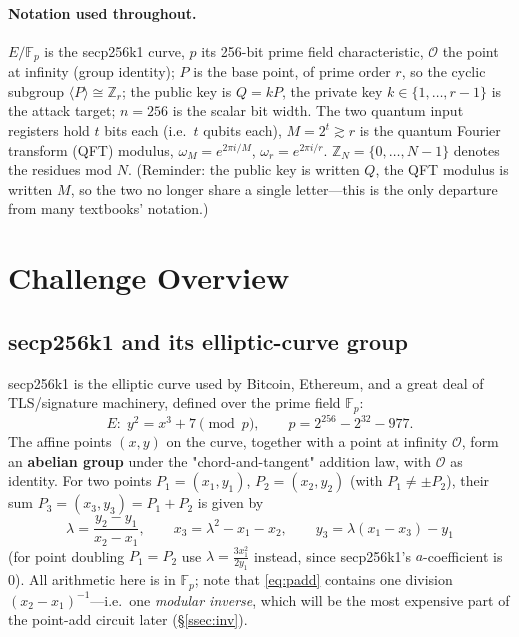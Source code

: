 \documentclass[11pt]{article}
\newcommand{\secref}[1]{\hyperref[#1]{\S\ref*{#1}}}
\begin{document}
\paragraph{Notation used throughout.}
$E/\mathbb{F}_p$ is the secp256k1 curve, $p$ its 256-bit prime field characteristic, $\mathcal{O}$ the point at infinity (group identity);
$P$ is the base point, of prime order $r$, so the cyclic subgroup $\langle P\rangle\cong\mathbb{Z}_r$; the public key is $Q=kP$, the private key
$k\in\{1,\dots,r-1\}$ is the attack target; $n=256$ is the scalar bit width. The two quantum input registers hold $t$ bits each (i.e.\ $t$ qubits each), $M=2^{t}\gtrsim r$ is the quantum Fourier
transform (QFT) modulus, $\omega_M=e^{2\pi i/M}$, $\omega_r=e^{2\pi i/r}$. $\mathbb{Z}_N=\{0,\dots,N-1\}$
denotes the residues mod $N$. (Reminder: the public key is written $Q$, the QFT modulus is written $M$, so the two no longer share a single letter---this is the only departure from many textbooks' notation.)

\section{Challenge Overview}
\label{sec:overview}

\subsection{secp256k1 and its elliptic-curve group}

secp256k1 is the elliptic curve used by Bitcoin, Ethereum, and a great deal of TLS/signature machinery, defined over the prime field $\mathbb{F}_p$:
\[
E:\;y^2 = x^3 + 7 \pmod p,\qquad p = 2^{256}-2^{32}-977 .
\]
The affine points $(x,y)$ on the curve, together with a point at infinity $\mathcal{O}$, form an \textbf{abelian group} under the "chord-and-tangent" addition law, with $\mathcal{O}$
as identity. For two points $P_1=(x_1,y_1)$, $P_2=(x_2,y_2)$ (with $P_1\neq\pm P_2$), their sum $P_3=(x_3,y_3)=P_1+P_2$ is given by
\begin{equation}
\lambda=\frac{y_2-y_1}{x_2-x_1},\qquad x_3=\lambda^2-x_1-x_2,\qquad y_3=\lambda(x_1-x_3)-y_1
\label{eq:padd}
\end{equation}
(for point doubling $P_1=P_2$ use $\lambda=\tfrac{3x_1^2}{2y_1}$ instead, since secp256k1's $a$-coefficient is $0$). All arithmetic here is in
$\mathbb{F}_p$; note that \eqref{eq:padd} contains one division $(x_2-x_1)^{-1}$---i.e.\ one \emph{modular inverse},
which will be the most expensive part of the point-add circuit later (\secref{ssec:inv}).
\end{document}
